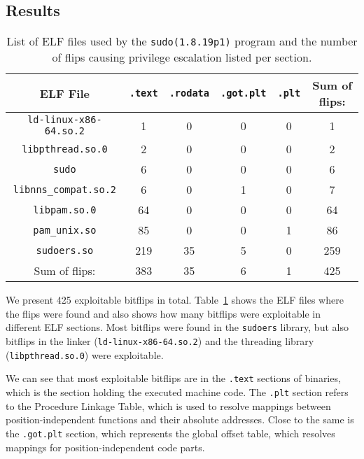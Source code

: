 \subsection{Results}

\begin{table}[!htb]
\centering
\begin{tabular}{c|cccc|c}
ELF File & \texttt{.text}  & \texttt{.rodata} & \texttt{.got.plt} &
\texttt{.plt} & Sum of flips:                             \\ \hline
\texttt{ld-linux-x86-64.so.2} & 1   & 0  & 0  & 0  & 1    \\
\texttt{libpthread.so.0}      & 2   & 0  & 0  & 0  & 2    \\
\texttt{sudo}                 & 6   & 0  & 0  & 0  & 6    \\
\texttt{libnns\_compat.so.2}  & 6   & 0  & 1  & 0  & 7    \\
\texttt{libpam.so.0}          & 64  & 0  & 0  & 0  & 64   \\
\texttt{pam\_unix.so}         & 85  & 0  & 0  & 1  & 86   \\
\texttt{sudoers.so}           & 219 & 35 & 5  & 0  & 259  \\ \hline
Sum of flips:                 & 383 & 35 & 6  & 1  & 425
\end{tabular}
\caption{List of ELF files used by the \texttt{sudo(1.8.19p1)} program and the
number of flips causing privilege escalation listed per section.}
\label{tab:sudores}
\end{table}

We present \num{425} exploitable bitflips in total. Table~\ref{tab:sudores}
shows the ELF files where the flips were found and also shows how many bitflips
were exploitable in different ELF sections.  Most bitflips were found in the
\texttt{sudoers} library, but also bitflips in the linker
(\texttt{ld-linux-x86-64.so.2}) and the threading library
(\texttt{libpthread.so.0}) were exploitable.

We can see that most exploitable bitflips are in the \texttt{.text} sections of
binaries, which is the section holding the executed machine code. The
\texttt{.plt} section refers to the Procedure Linkage Table, which is used to
resolve mappings between position-independent functions and their absolute
addresses. Close to the same is the \texttt{.got.plt} section, which represents
the global offset table, which resolves mappings for position-independent code
parts.

